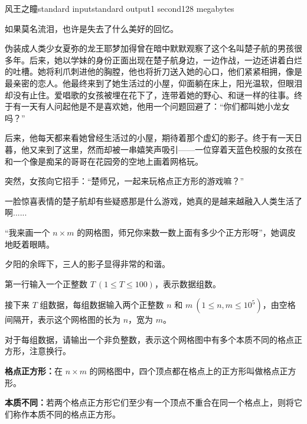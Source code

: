 \begin{problem}{风王之瞳}{standard input}{standard output}{1 second}{128 megabytes}

    如果莫名流泪，也许是失去了什么美好的回忆。

    伪装成人类少女夏弥的龙王耶梦加得曾在暗中默默观察了这个名叫楚子航的男孩很多年。后来，她以学妹的身份正面出现在楚子航身边，一边作战，一边还讲着白烂的吐槽。她将利爪刺进他的胸膛，他也将折刀送入她的心口，他们紧紧相拥，像是最亲密的恋人。他最终来到了她生活过的小屋，仰面躺在床上，阳光温软，但眼泪却没有止住。爱唱歌的女孩被埋在花下了，连带着她的野心、和谜一样的往事。终于有一天有人问起他是不是喜欢她，他用一个问题回避了：“你们都叫她小龙女吗？”

    后来，他每天都来看她曾经生活过的小屋，期待着那个虚幻的影子。终于有一天日暮，他又来到了这里，然而却被一串嬉笑声吸引——一位穿着天蓝色校服的女孩在和一个像是痴呆的哥哥在花园旁的空地上画着网格玩。

    突然，女孩向它招手：“楚师兄，一起来玩格点正方形的游戏嘛？”

    一脸惊喜表情的楚子航却有些疑惑那是什么游戏，她真的是越来越融入人类生活了啊......

    “我来画一个 $n\times m$ 的网格图，师兄你来数一数上面有多少个正方形呀”，她调皮地眨着眼睛。

    夕阳的余晖下，三人的影子显得非常的和谐。

    \InputFile
    
    第一行输入一个正整数 $T\ (1\le T\le 100)$，表示数据组数。

    接下来 $T$ 组数据，每组数据输入两个正整数 $n$ 和 $m\ (1\le n,m\le 10^5)$，由空格间隔开，表示这个网格图的长为 $n$，宽为 $m$。
    
    \OutputFile
    
    对于每组数据，请输出一个非负整数，表示这个网格图中有多个本质不同的格点正方形，注意换行。
    
    \Example
    
    \begin{example}
    \end{example}

    \Note

    \textbf{格点正方形：}在 $n\times m$ 的网格图中，四个顶点都在格点上的正方形叫做格点正方形。

    \textbf{本质不同：}若两个格点正方形它们至少有一个顶点不重合在同一个格点上，则将它们称作本质不同的格点正方形。

\end{problem}